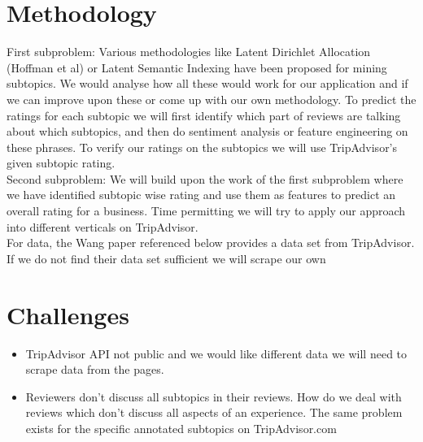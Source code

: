 \documentclass[preprint,10pt]{elsarticle}
\begin{document}
\section{Methodology}
First subproblem: Various methodologies like Latent Dirichlet Allocation (Hoffman et al) or Latent Semantic Indexing have been proposed for mining subtopics. We would analyse how all these would work for our application and if we can improve upon these or come up with our own methodology. To predict the ratings for each subtopic we will first identify which part of reviews are talking about which subtopics, and then do sentiment analysis or feature engineering on these phrases. To verify our ratings on the subtopics we will use TripAdvisor's given subtopic rating.\\

Second subproblem: We will build upon the work of the first subproblem where we have identified subtopic wise rating and use them as features to predict an overall rating for a business. Time permitting we will try to apply our approach into different verticals on TripAdvisor.\\

For data, the Wang paper referenced below \cite{LARA} provides a data set from TripAdvisor. If we do not find their data set sufficient we will scrape our own

\section{Challenges}
\begin{itemize}
\item
TripAdvisor API not public and we would like different data we will need to scrape data from the pages.

\item
Reviewers don't discuss all subtopics in their reviews. How do we deal with reviews which don't discuss all aspects of an experience. The same problem exists for the specific annotated subtopics on TripAdvisor.com


\end{itemize}
\end{document}
